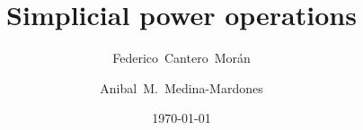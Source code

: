 \documentclass{amsart}
\title{Simplicial power operations}
\author[F. Cantero-Mor\'an]{Federico~Cantero~Mor\'an}
\author[A.M.~Medina-Mardones]{Anibal~M.~Medina-Mardones}
\date{\today}
\begin{document}
	
	\maketitle
	
	
	
    
	
    
	
    
    
    
    
    
%	
%    
%	
%    
%	
%	
	\sloppy
	\printbibliography
\end{document}
